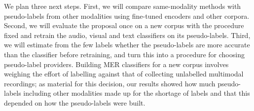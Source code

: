 We plan three next steps. First, we will compare same-modality methods with pseudo-labels from other modalities using fine-tuned encoders and other corpora. Second, we will evaluate the proposal once on a new corpus with the procedure fixed and retrain the audio, visual and text classifiers on its pseudo-labels. Third, we will estimate from the few labels whether the pseudo-labels are more accurate than the classifier before retraining, and turn this into a procedure for choosing pseudo-label providers. Building MER classifiers for a new corpus involves weighing the effort of labelling against that of collecting unlabelled multimodal recordings; as material for this decision, our results showed how much pseudo-labels including other modalities made up for the shortage of labels and that this depended on how the pseudo-labels were built.
